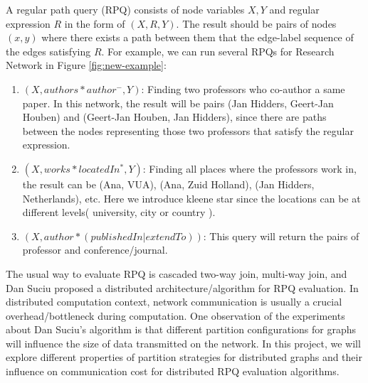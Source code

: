 A regular path query (RPQ) consists of node variables $X,Y$ and regular expression $R$ in the form of $(X,R,Y)$. The result should be pairs of nodes $(x,y)$ where there exists a path between them that the edge-label sequence of the edges satisfying $R$. For example, we can run several RPQs for Research Network in Figure \ref{fig:new-example}:
\begin{enumerate}
    \item $(X,authors*author^-,Y)$: Finding two professors who co-author a same paper. In this network, the result will be pairs (Jan Hidders, Geert-Jan Houben) and (Geert-Jan Houben, Jan Hidders), since there are paths between the nodes representing those two professors that satisfy the regular expression.
    \item $(X,works*locatedIn^*,Y)$: Finding all places where the professors work in, the result can be (Ana, VUA), (Ana, Zuid Holland), (Jan Hidders, Netherlands), etc. Here we introduce kleene star since the locations can be at different levels( university, city or country ).
    \item $(X,author*(publishedIn|extendTo))$: This query will return the pairs of professor and conference/journal.
\end{enumerate}
The usual way to evaluate RPQ is cascaded two-way join, multi-way join\cite{afrati2010optimizing}, and Dan Suciu proposed a distributed architecture/algorithm for RPQ evaluation\cite{suciu2002distributed}. In distributed computation context, network communication is usually a crucial overhead/bottleneck during computation. One observation of the experiments about Dan Suciu's algorithm is that different partition configurations for graphs will influence the size of data transmitted on the network. In this project, we will explore different properties of partition strategies for distributed graphs and their influence on communication cost for distributed RPQ evaluation algorithms.

